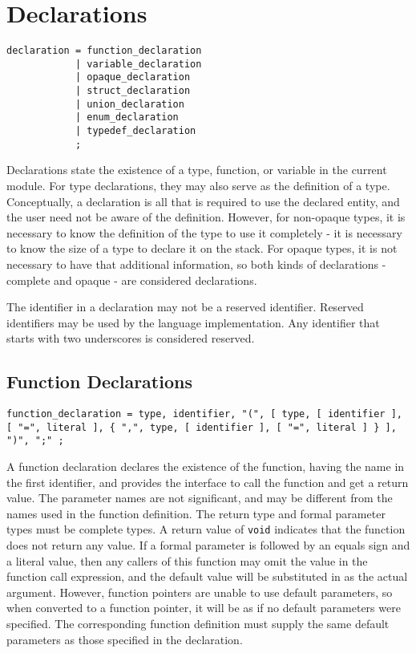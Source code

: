 \documentclass[letterpaper,12pt]{book}
\begin{document}
\chapter{Declarations}

\begin{lstlisting}[breaklines=true]
declaration = function_declaration
            | variable_declaration
            | opaque_declaration
            | struct_declaration
            | union_declaration
            | enum_declaration
            | typedef_declaration
            ;
\end{lstlisting}

Declarations state the existence of a type, function, or variable in the current module. For type declarations, they may also serve as the definition of a type. Conceptually, a declaration is all that is required to use the declared entity, and the user need not be aware of the definition. However, for non-opaque types, it is necessary to know the definition of the type to use it completely - it is necessary to know the size of a type to declare it on the stack. For opaque types, it is not necessary to have that additional information, so both kinds of declarations - complete and opaque - are considered declarations.

The identifier in a declaration may not be a reserved identifier. Reserved identifiers may be used by the language implementation. Any identifier that starts with two underscores is considered reserved.

\section{Function Declarations}\label{section:Function Declarations}

\begin{lstlisting}[breaklines=true]
function_declaration = type, identifier, "(", [ type, [ identifier ], [ "=", literal ], { ",", type, [ identifier ], [ "=", literal ] } ], ")", ";" ;
\end{lstlisting}

A function declaration declares the existence of the function, having the name in the first identifier, and provides the interface to call the function and get a return value. The parameter names are not significant, and may be different from the names used in the function definition. The return type and formal parameter types must be complete types. A return value of \texttt{void} indicates that the function does not return any value. If a formal parameter is followed by an equals sign and a literal value, then any callers of this function may omit the value in the function call expression, and the default value will be substituted in as the actual argument. However, function pointers are unable to use default parameters, so when converted to a function pointer, it will be as if no default parameters were specified. The corresponding function definition must supply the same default parameters as those specified in the declaration.
\end{document}
